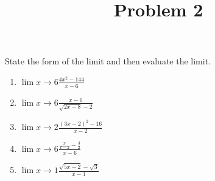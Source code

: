 \documentclass{ximera}
\title[Problem 2]{Problem 2}
\begin{document}
\begin{abstract} \end{abstract}
\maketitle

\begin{problem}
State the form of the limit and then evaluate the limit. 
	
	\begin{enumerate}
	
	\item $ \displaystyle \lim{x \to 6} \frac{4x^2 - 144}{x-6}  $
	\item  $ \displaystyle \lim{x \to 6} \frac{x-6}{\sqrt{2x-8} - 2}  $
	\item  $ \displaystyle \lim{x \to 2} \frac{(3x-2)^2 - 16}{x-2}  $
	\item $ \displaystyle \lim{x \to 6} \frac{\frac{x}{x-2} - \frac{3}{2}}{x-6}  $
	\item  $ \displaystyle \lim{x \to 1} \frac{\sqrt{5x-2} - \sqrt{3}}{x-1} $
\end{enumerate}
\end{problem}
\end{document}
